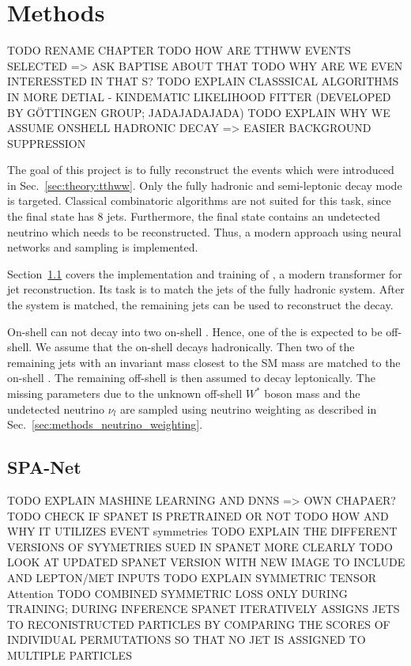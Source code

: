\documentclass[bachelor,ngerman,english]{GAUBM}
\begin{document}
\chapter{Methods}
\label{ch:methods}
TODO RENAME CHAPTER
TODO HOW ARE TTHWW EVENTS SELECTED => ASK BAPTISE ABOUT THAT
TODO WHY ARE WE EVEN INTERESSTED IN THAT S?
TODO EXPLAIN CLASSSICAL ALGORITHMS IN MORE DETIAL - KINDEMATIC LIKELIHOOD FITTER (DEVELOPED BY GÖTTINGEN GROUP; JADAJADAJADA)
TODO EXPLAIN WHY WE ASSUME ONSHELL HADRONIC DECAY => EASIER BACKGROUND SUPPRESSION

The goal of this project is to fully reconstruct the \ttHWW events which were introduced in Sec.~\ref{sec:theory:tthww}. Only the fully hadronic \ttbar and semi-leptonic \HWW decay mode is targeted. Classical combinatoric algorithms are not suited for this task, since the final state has 8 jets. Furthermore, the final state contains an undetected neutrino which needs to be reconstructed. Thus, a modern approach using neural networks and sampling is implemented.

Section~\ref{sec:methods_spanet} covers the implementation and training of \spanet, a modern transformer for jet reconstruction. Its task is to match the jets of the fully hadronic \ttbar system. After the \ttbar system is matched, the remaining jets can be used to reconstruct the \HWW decay. 

On-shell \Hbosons can not decay into two on-shell \wbosons. Hence, one of the \wbosons is expected to be off-shell. We assume that the on-shell \wboson decays hadronically. Then two of the remaining jets with an invariant mass closest to the \wboson SM mass are matched to the on-shell \wboson. The remaining off-shell \wboson is then assumed to decay leptonically. The missing parameters due to the unknown off-shell $W^*$ boson mass and the undetected neutrino $\nu_l$ are sampled using neutrino weighting as described in Sec.~\ref{sec:methods_neutrino_weighting}.

\section{SPA-Net}
\label{sec:methods_spanet}
TODO EXPLAIN MASHINE LEARNING AND DNNS => OWN CHAPAER?
TODO CHECK IF SPANET IS PRETRAINED OR NOT
TODO HOW AND WHY IT UTILIZES EVENT symmetries
TODO EXPLAIN THE DIFFERENT VERSIONS OF SYYMETRIES SUED IN SPANET MORE CLEARLY
TODO LOOK AT UPDATED SPANET VERSION WITH NEW IMAGE TO INCLUDE AND LEPTON/MET INPUTS
TODO EXPLAIN SYMMETRIC TENSOR Attention
TODO COMBINED SYMMETRIC LOSS ONLY DURING TRAINING; DURING INFERENCE SPANET ITERATIVELY ASSIGNS JETS TO RECONISTRUCTED PARTICLES BY COMPARING THE SCORES OF INDIVIDUAL PERMUTATIONS SO THAT NO JET IS ASSIGNED TO MULTIPLE PARTICLES
\end{document}
